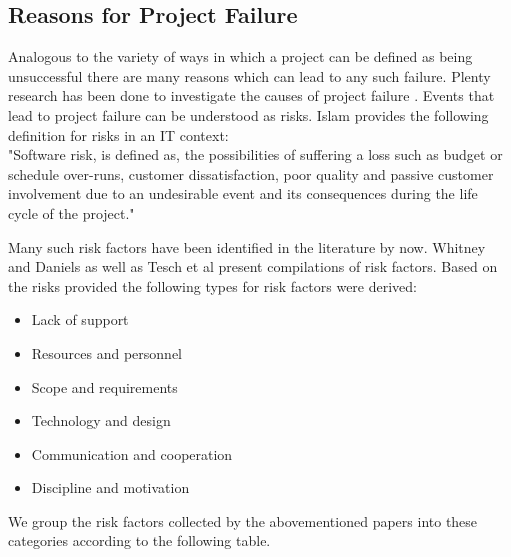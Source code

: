 \subsection{Reasons for Project Failure}
\label{sec:theorAb}	
Analogous to the variety of ways in which a project can be defined as being unsuccessful there are many reasons which can lead to any such failure. Plenty research has been done to investigate the causes of project failure \cite{guptaSystematicLiteratureReview2018}.  Events that lead to project failure can be understood as risks. Islam \cite{islamSoftwareDevelopmentRisk2011} provides the following definition for risks in an IT context:\\
"Software risk, is defined as, the possibilities of suffering a loss such as budget or schedule over-runs, customer dissatisfaction, poor quality and passive customer involvement due to an undesirable event and its consequences during the life cycle of the project."

Many such risk factors have been identified in the literature by now. Whitney and Daniels \cite{whitneyRootCauseFailure2013} as well as Tesch et al \cite{teschITProjectRisk2007} present compilations of risk factors. Based on the risks provided the following types for risk factors were derived:
 \begin{itemize}	
 	\item	Lack of support
 	\item	Resources and personnel	
 	\item	Scope and requirements	
 	\item	Technology and design	
 	\item	Communication and cooperation
 	\item	Discipline and motivation
\end{itemize}		
We group the risk factors collected by the abovementioned papers into these categories according to the following table.

